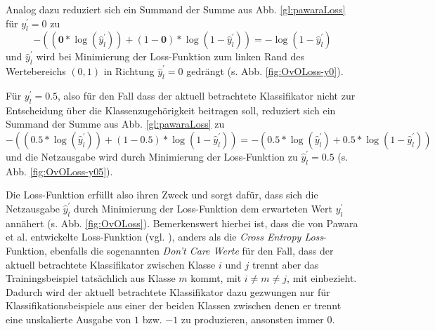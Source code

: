 Analog dazu reduziert sich ein Summand der Summe aus Abb. \ref{gl:pawaraLoss} für $y_{l}^{'} = 0$ zu
\[-((\boldsymbol{0} * \log{(\widehat{y}_{l}^{'})}) + (1 - \boldsymbol{0}) * \log{(1-\widehat{y}_{l}^{'})}) = -\log{(1-\widehat{y}_{l}^{'})}\]
und $\widehat{y}_{l}^{'}$ wird bei Minimierung der Loss-Funktion zum linken Rand des Wertebereichs $(0, 1)$ in Richtung $\widehat{y}_{l}^{'}=0$  gedrängt (s. Abb. \ref{fig:OvOLoss-y0}).

Für $y_{l}^{'} = 0.5$, also für den Fall dass der aktuell betrachtete Klassifikator nicht zur Entscheidung über die Klassenzugehörigkeit beitragen soll, reduziert sich ein Summand der Summe aus Abb. \ref{gl:pawaraLoss} zu
\[-((\boldsymbol{0.5} * \log{(\widehat{y}_{l}^{'})}) + (1 - \boldsymbol{0.5}) * \log{(1-\widehat{y}_{l}^{'})}) = - (0.5 * \log{(\widehat{y}_{l}^{'})} + 0.5 * \log{(1-\widehat{y}_{l}^{'})})\]
und die Netzausgabe wird durch Minimierung der Loss-Funktion zu $\widehat{y}_{l}^{'}=0.5$ (s. Abb. \ref{fig:OvOLoss-y05}).

Die Loss-Funktion erfüllt also ihren Zweck und sorgt dafür, dass sich die Netzausgabe $\widehat{y}_{l}^{'}$ durch Minimierung der Loss-Funktion dem erwarteten Wert $y_{l}^{'}$ annähert (s. Abb. \ref{fig:OvOLoss}). Bemerkenswert hierbei ist, dass die von Pawara et al. entwickelte Loss-Funktion (vgl. \cite{pawaraPaper}), anders als die \textit{Cross Entropy Loss}-Funktion, ebenfalls die sogenannten \textit{Don't Care Werte} für den Fall, dass der aktuell betrachtete Klassifikator zwischen Klasse $i$ und $j$ trennt aber das Trainingsbeispiel tatsächlich aus Klasse $m$ kommt, mit $i\neq m \neq j$, mit einbezieht. Dadurch wird der aktuell betrachtete Klassifikator dazu gezwungen nur für Klassifikationsbeispiele aus einer der beiden Klassen zwischen denen er trennt eine unskalierte Ausgabe von $1$ bzw. $-1$ zu produzieren, ansonsten immer $0$.

